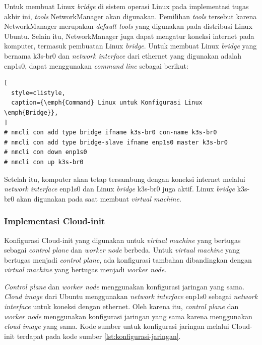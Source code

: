 Untuk membuat Linux \emph{bridge} di sistem operasi Linux pada implementasi tugas akhir ini,
\emph{tools} NetworkManager akan digunakan. Pemilihan \emph{tools} tersebut karena
NetworkManager merupakan \emph{default tools} yang digunakan pada distribusi Linux
Ubuntu. Selain itu, NetworkManager juga dapat mengatur koneksi internet pada
komputer, termasuk pembuatan Linux \emph{bridge}. Untuk membuat Linux \emph{bridge}
yang bernama k3s-br0 dan \emph{network interface} dari ethernet yang digunakan
adalah enp1s0, dapat menggunakan \emph{command line} sebagai berikut:

\begin{lstlisting}[
  style=clistyle,
  caption={\emph{Command} Linux untuk Konfigurasi Linux \emph{Bridge}},
]
# nmcli con add type bridge ifname k3s-br0 con-name k3s-br0
# nmcli con add type bridge-slave ifname enp1s0 master k3s-br0
# nmcli con down enp1s0
# nmcli con up k3s-br0
\end{lstlisting}

Setelah itu, komputer akan tetap tersambung dengan koneksi internet melalui
\emph{network interface} enp1s0 dan Linux \emph{bridge} k3s-br0 juga aktif.
Linux \emph{bridge} k3s-br0 akan digunakan pada saat membuat \emph{virtual machine}.
\subsubsection{Implementasi Cloud-init}
\label{sec:implementasi-cloud-init}

Konfigurasi Cloud-init yang digunakan untuk \emph{virtual machine} yang bertugas sebagai \emph{control plane}
dan \emph{worker node} berbeda. Untuk \emph{virtual machine} yang bertugas menjadi \emph{control plane},
ada konfigurasi tambahan dibandingkan dengan \emph{virtual machine} yang bertugas menjadi \emph{worker node}.

\emph{Control plane} dan \emph{worker node} menggunakan konfigurasi jaringan yang sama. \emph{Cloud image}
dari Ubuntu menggunakan \emph{network interface} enp1s0 sebagai \emph{network interface} untuk
koneksi dengan ethernet. Oleh karena itu, \emph{control plane} dan \emph{worker node} menggunakan
konfigurasi jaringan yang sama karena menggunakan \emph{cloud image} yang sama. Kode sumber untuk
konfigurasi jaringan melalui Cloud-init terdapat pada kode sumber \ref{lst:konfigurasi-jaringan}.



